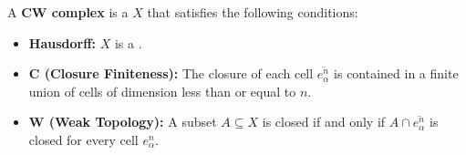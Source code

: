 



\begin{definition}[CW Complex] \label{definition:CW_complex}
A \textbf{CW complex} is a  $X$ that satisfies the following conditions:
\begin{itemize}
    \item \textbf{Hausdorff:} $X$ is a .
    
    \item \textbf{C (Closure Finiteness):} The closure of each cell $\overline{e_{\alpha}^n}$ is contained in a finite union of cells of dimension less than or equal to $n$.
    
    \item \textbf{W (Weak Topology):} A subset $A \subseteq X$ is closed if and only if $A \cap \overline{e_{\alpha}^n}$ is closed for every cell $e_{\alpha}^n$.
\end{itemize}
\end{definition}